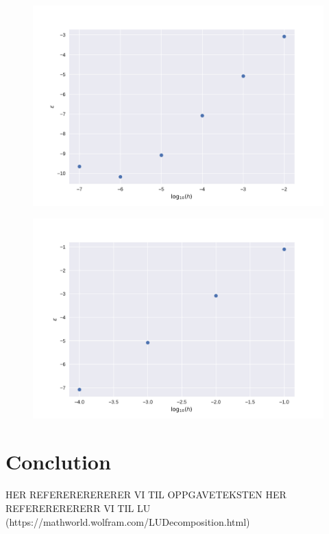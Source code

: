 \documentclass[reprint, english,notitlepage]{revtex4-1}  %
\begin{document}
\begin{figure}[h]
	\centering
	\includegraphics[scale=0.5]{../output/fast_errors.pdf}
	\label{fig:fast_error}
	\caption{
		\label{fig:illustrasjon}} 
\end{figure}

\begin{figure}[h]
	\centering
	\includegraphics[scale=0.5]{../output/lu_errors.pdf}
	\label{fig:fast_error}
	\caption{
		\label{fig:illustrasjon}} 
\end{figure}

\section{Conclution}

\onecolumngrid
\vspace{1cm} %
\newpage
\begin{thebibliography}{}
 HER REFERERERERERER VI TIL OPPGAVETEKSTEN
 HER REFERERERERERR VI TIL LU (https://mathworld.wolfram.com/LUDecomposition.html)
\end{thebibliography}
\end{document}
